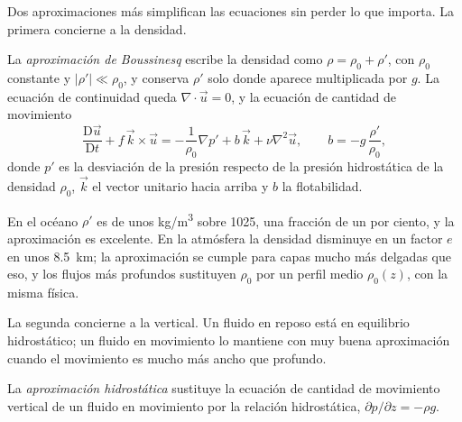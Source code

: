 \begin{omfigure}
\par{}\label{fig:b3:gfd-foundations:frame}
\end{omfigure}

Dos aproximaciones más simplifican las ecuaciones sin
perder lo que importa. La primera concierne a la densidad.

\begin{definition}\label{def:b3:gfd-foundations:boussinesq}
La \emph{aproximación de Boussinesq} escribe
la densidad como $\rho = \rho_0 + \rho'$, con $\rho_0$ constante y
$|\rho'| \ll \rho_0$, y conserva $\rho'$ solo donde aparece multiplicada por $g$.
La ecuación de continuidad queda $\nabla\cdot\vec u = 0$, y la
ecuación de cantidad de movimiento
\[
\frac{\mathrm D\vec u}{\mathrm Dt} + f\,\vec k\times\vec u =
-\frac{1}{\rho_0}\nabla p' + b\,\vec k + \nu\nabla^2\vec u ,
\qquad b = -g\,\frac{\rho'}{\rho_0} ,
\]
donde $p'$ es la desviación de la presión respecto de la presión hidrostática
de la densidad $\rho_0$, $\vec k$ el vector unitario hacia arriba y $b$ la
flotabilidad.
\end{definition}

En el océano $\rho'$ es de unos \unit{kg/m^3} sobre \num{1025}, una fracción de un
por ciento, y la aproximación es excelente. En la atmósfera la densidad
disminuye en un factor $e$ en unos \qty{8.5}{km}; la aproximación se cumple para
capas mucho más delgadas que eso, y los flujos más profundos sustituyen $\rho_0$ por un
perfil medio $\rho_0(z)$, con la misma física.

La segunda concierne a la vertical. Un fluido en reposo está en equilibrio
hidrostático; un fluido en movimiento lo mantiene con muy buena aproximación cuando
el movimiento es mucho más ancho que profundo.

\begin{definition}\label{def:b3:gfd-foundations:hydrostatic}
La \emph{aproximación hidrostática}
sustituye la ecuación de cantidad de movimiento vertical de un fluido en
movimiento por la relación hidrostática, $\partial p/\partial z = -\rho g$.
\end{definition}

